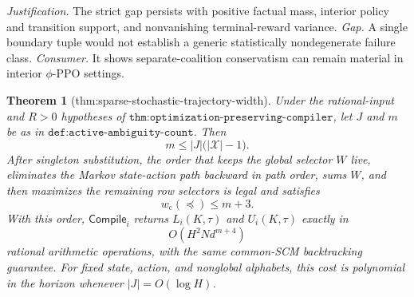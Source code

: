 \documentclass{article}
\newtheorem{theorem}{Theorem}
\begin{document}
\par\smallskip\noindent \textit{Justification.} The strict gap persists with positive factual mass, interior policy and transition support, and nonvanishing terminal-reward variance. \textit{Gap.} A single boundary tuple would not establish a generic statistically nondegenerate failure class. \textit{Consumer.} It shows separate-coalition conservatism can remain material in interior \(\phi\)-PPO settings.

\begin{theorem}[thm:sparse-stochastic-trajectory-width]\label{thm:sparse-stochastic-trajectory-width}
Under the rational-input and \(R>0\) hypotheses of \(\texttt{thm:optimization-preserving-compiler}\), let \(J\) and \(m\) be as in \(\texttt{def:active-ambiguity-count}\).  Then
\[
 m\le |J|\bigl(|\mathcal X|-1\bigr).
\]
After singleton substitution, the order that keeps the global selector \(W\) live, eliminates the Markov state-action path backward in path order, sums \(W\), and then maximizes the remaining row selectors is legal and satisfies
\[
 w_{\mathrm c}(\preceq)\le m+3.
\]
With this order, \(\mathsf{Compile}_i\) returns \(L_i(K,\tau)\) and \(U_i(K,\tau)\) exactly in
\[
 O\!\left(H^2N d^{m+4}\right)
\]
rational arithmetic operations, with the same common-SCM backtracking guarantee.  For fixed state, action, and nonglobal alphabets, this cost is polynomial in the horizon whenever \(|J|=O(\log H)\).
\end{theorem}
\end{document}
